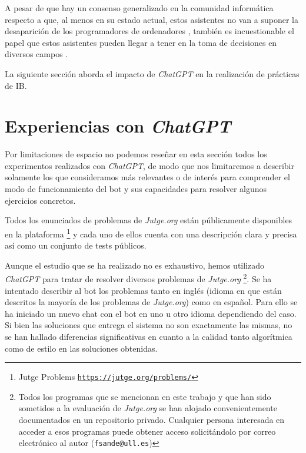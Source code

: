\documentclass[twocolumn,twoside,a4paper, 10pt]{article}
\newcommand{\jutge}{\textit{Jutge.org}{}}           %
\newcommand{\ChatGPT}{\textit{ChatGPT}{}}           %
\begin{document}
A pesar de que hay un consenso generalizado en la comunidad informática respecto a que, al menos en su estado
actual, estos asistentes no van a suponer la desaparición de los programadores de ordenadores
\cite{Castelvecchi:2022:ACaA}, 
también es incuestionable el papel que estos asistentes pueden llegar a tener en la toma de decisiones en
diversos campos 
\cite{Kung:2022:PCU}.


La siguiente sección aborda el impacto de \ChatGPT{} en la realización de prácticas de IB.
\section{Experiencias con \ChatGPT{}}
Por limitaciones de espacio no podemos reseñar en esta sección todos los experimentos realizados con
\ChatGPT{}, de modo que nos limitaremos a describir solamente los que consideramos más relevantes o de interés
para comprender el modo de funcionamiento del bot y sus capacidades para resolver algunos ejercicios
concretos.

Todos los enunciados de problemas de \jutge{} están públicamente disponibles en la
plataforma 
\footnote{Jutge Problems \href{https://jutge.org/problems/}{\scriptsize{\texttt{https://jutge.org/problems/}}}}
y cada uno de ellos cuenta con una descripción clara y precisa así como un conjunto de tests públicos.

Aunque el estudio que se ha realizado no es exhaustivo, hemos utilizado \ChatGPT{} para tratar de resolver
diversos problemas de \jutge{}
\footnote{
Todos los programas que se mencionan en este trabajo y que han sido sometidos a la evaluación de \jutge{} se
han alojado convenientemente documentados en un repositorio privado.
Cualquier persona interesada en acceder a esos programas puede obtener acceso solicitándolo por correo
electrónico al autor (\texttt{fsande@ull.es})
}. 
Se ha intentado describir al bot los problemas tanto en inglés (idioma en que están descritos la mayoría de
los problemas de \jutge{}) como en español.
Para ello se ha iniciado un nuevo chat con el bot en uno u otro idioma dependiendo del caso.
Si bien las soluciones que entrega el sistema no son exactamente las mismas, no se han hallado diferencias
significativas en cuanto a la calidad tanto algorítmica como de estilo en las soluciones obtenidas.
\end{document}

